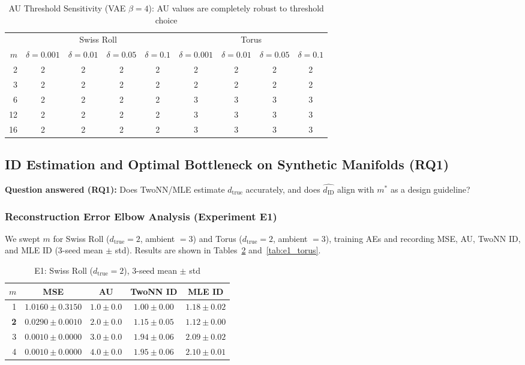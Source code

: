\documentclass[lettersize,journal]{IEEEtran}
\newcommand{\dID}{d_{\mathrm{ID}}}
\newcommand{\dtrue}{d_{\mathrm{true}}}
\begin{document}
\begin{table}[!t]
\centering
\caption{AU Threshold Sensitivity (VAE $\beta=4$): AU values are completely robust to threshold choice}
\label{tab:delta_sensitivity}
\begin{tabular}{rcccc|cccc}
\toprule
 & \multicolumn{4}{c|}{Swiss Roll} & \multicolumn{4}{c}{Torus} \\
$m$ & $\delta{=}0.001$ & $\delta{=}0.01$ & $\delta{=}0.05$ & $\delta{=}0.1$
    & $\delta{=}0.001$ & $\delta{=}0.01$ & $\delta{=}0.05$ & $\delta{=}0.1$ \\
\midrule
2  & 2 & 2 & 2 & 2 & 2 & 2 & 2 & 2 \\
3  & 2 & 2 & 2 & 2 & 2 & 2 & 2 & 2 \\
6  & 2 & 2 & 2 & 2 & 3 & 3 & 3 & 3 \\
12 & 2 & 2 & 2 & 2 & 3 & 3 & 3 & 3 \\
16 & 2 & 2 & 2 & 2 & 3 & 3 & 3 & 3 \\
\bottomrule
\end{tabular}
\end{table}

\subsection{ID Estimation and Optimal Bottleneck on Synthetic Manifolds (RQ1)}\label{sec:exp_synthetic}

\textbf{Question answered (RQ1):} Does TwoNN/MLE estimate $\dtrue$ accurately, and does $\hat{\dID}$ align with $m^*$ as a design guideline?

\subsubsection{Reconstruction Error Elbow Analysis (Experiment E1)}

We swept $m$ for Swiss Roll ($\dtrue = 2$, ambient $= 3$) and Torus ($\dtrue = 2$, ambient $= 3$), training AEs and recording MSE, AU, TwoNN ID, and MLE ID (3-seed mean $\pm$ std).
Results are shown in Tables~\ref{tab:e1_swissroll} and~\ref{tab:e1_torus}.

\begin{table}[!t]
\centering
\caption{E1: Swiss Roll ($\dtrue = 2$), 3-seed mean $\pm$ std}
\label{tab:e1_swissroll}
\begin{tabular}{rcccc}
\toprule
$m$ & MSE & AU & TwoNN ID & MLE ID \\
\midrule
1 & $1.0160\pm0.3150$ & $1.0\pm0.0$ & $1.00\pm0.00$ & $1.18\pm0.02$ \\
\textbf{2} & $\boldsymbol{0.0290\pm0.0010}$ & $2.0\pm0.0$ & $1.15\pm0.05$ & $1.12\pm0.00$ \\
3 & $0.0010\pm0.0000$ & $3.0\pm0.0$ & $1.94\pm0.06$ & $2.09\pm0.02$ \\
4 & $0.0010\pm0.0000$ & $4.0\pm0.0$ & $1.95\pm0.06$ & $2.10\pm0.01$ \\
\bottomrule
\end{tabular}
\end{table}
\end{document}
